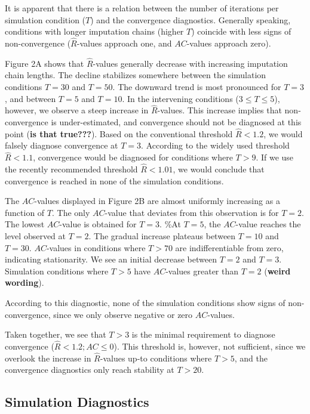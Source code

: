 \documentclass[Royal,times,sageh]{sagej}
\begin{document}
It is apparent that there is a relation between the number of iterations
per simulation condition (\(T\)) and the convergence diagnostics.
Generally speaking, conditions with longer imputation chains (higher
\(T\)) coincide with less signs of non-convergence
(\(\widehat{R}\)-values approach one, and \(AC\)-values approach zero).

Figure 2A shows that \(\widehat{R}\)-values generally decrease with
increasing imputation chain lengths. The decline stabilizes somewhere
between the simulation conditions \(T=30\) and \(T=50\). The downward
trend is most pronounced for \(T=3\), and between \(T = 5\) and
\(T = 10\). In the intervening conditions (\(3 \leq T \leq 5\)),
however, we observe a steep increase in \(\widehat{R}\)-values. This
increase implies that non-convergence is under-estimated, and
convergence should not be diagnosed at this point (\textbf{is that
true???}). Based on the conventional threshold \(\widehat{R} < 1.2\), we
would falsely diagnose convergence at \(T=3\). According to the widely
used threshold \(\widehat{R} < 1.1\), convergence would be diagnosed for
conditions where \(T>9\). If we use the recently recommended threshold
\(\widehat{R} < 1.01\), we would conclude that convergence is reached in
none of the simulation conditions.

The \(AC\)-values displayed in Figure 2B are almost uniformly increasing
as a function of \(T\). The only \(AC\)-value that deviates from this
observation is for \(T=2\). The lowest \(AC\)-value is obtained for
\(T=3\). \%At \(T=5\), the \(AC\)-value reaches the level observed at
\(T=2\). The gradual increase plateaus between \(T=10\) and \(T=30\).
\(AC\)-values in conditions where \(T>70\) are indifferentiable from
zero, indicating stationarity. We see an initial decrease between
\(T=2\) and \(T=3\). Simulation conditions where \(T>5\) have
\(AC\)-values greater than \(T=2\) (\textbf{weird wording}).

According to this diagnostic, none of the simulation conditions show
signs of non-convergence, since we only observe negative or zero
\(AC\)-values.

Taken together, we see that \(T>3\) is the minimal requirement to
diagnose convergence (\(\widehat{R} < 1.2; AC \leq 0\)). This threshold
is, however, not sufficient, since we overlook the increase in
\(\widehat{R}\)-values up-to conditions where \(T>5\), and the
convergence diagnostics only reach stability at \(T>20\).

\hypertarget{simulation-diagnostics}{%
\subsection{Simulation Diagnostics}\label{simulation-diagnostics}}
\end{document}
